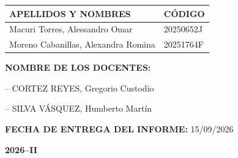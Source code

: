 \documentclass[11pt,a4paper]{article}
\begin{document}
\begin{titlepage}
\vspace{0.90cm}

\renewcommand{\arraystretch}{1.45}

\begin{center}

{\large
\begin{tabular}{|p{9.7cm}|p{3.4cm}|}
\hline

\textbf{APELLIDOS Y NOMBRES}
&
\textbf{CÓDIGO}
\\
\hline

Macuri Torres, Alessandro Omar
&
20250652J
\\
\hline

Moreno Cabanillas, Alexandra Romina
&
20251764F
\\
\hline

\end{tabular}
}

\end{center}


\vspace{0.85cm}

{\large\textbf{NOMBRE DE LOS DOCENTES:}}

\vspace{0.35cm}

{\large
\hspace{0.6cm}
-- CORTEZ REYES, Gregorio Custodio

\vspace{0.20cm}

\hspace{0.6cm}
-- SILVA VÁSQUEZ, Humberto Martín
}


\vspace{0.95cm}

{\large
\textbf{FECHA DE ENTREGA DEL INFORME:}
\hspace{0.40cm}
15/09/2026
}


\vspace{1.15cm}

\begin{center}
{\huge\bfseries 2026--II}
\end{center}

\end{titlepage}
\end{document}
